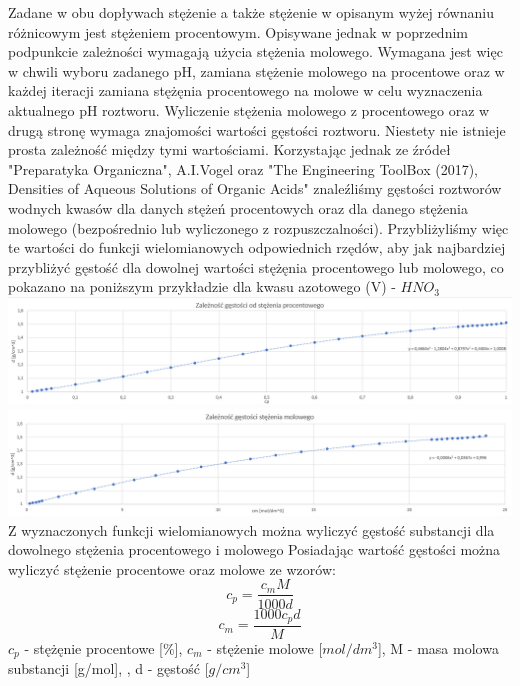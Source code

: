 \documentclass[polish,polish,a4paper,12pt]{article}
\begin{document}
\begin{enumerate}
	Zadane w obu dopływach stężenie a także stężenie w opisanym wyżej równaniu różnicowym jest stężeniem procentowym. Opisywane jednak w poprzednim podpunkcie zależności wymagają użycia stężenia molowego. Wymagana jest więc w chwili wyboru zadanego pH, zamiana stężenie molowego na procentowe oraz w każdej iteracji zamiana stężęnia procentowego na molowe w celu wyznaczenia aktualnego pH roztworu. Wyliczenie stężenia molowego z procentowego oraz w drugą stronę wymaga znajomości wartości gęstości roztworu. Niestety nie istnieje prosta zależność między tymi wartościami. Korzystając jednak ze źródeł "Preparatyka Organiczna", A.I.Vogel oraz "The Engineering ToolBox (2017), Densities of Aqueous Solutions of Organic Acids" znaleźliśmy gęstości roztworów wodnych kwasów dla danych stężeń procentowych oraz dla danego stężenia molowego (bezpośrednio lub wyliczonego z rozpuszczalności). Przybliżyliśmy więc te wartości do funkcji wielomianowych odpowiednich rzędów, aby jak najbardziej przybliżyć gęstość dla dowolnej wartości stężęnia procentowego lub molowego, co pokazano na poniższym przykładzie dla kwasu azotowego (V) - $HNO_3$\\
	
	\includegraphics[scale=0.4]{1}\\
	\includegraphics[scale=0.4]{2}\\
	
	Z wyznaczonych funkcji wielomianowych można wyliczyć gęstość substancji dla dowolnego stężenia procentowego i molowego
	Posiadając wartość gęstości można wyliczyć stężenie procentowe oraz molowe ze wzorów:
	\begin{equation*}
		c_p = \frac{c_mM}{1000d}
	\end{equation*}
	\begin{equation*}
		c_m = \frac{1000c_pd}{M}
	\end{equation*}
	{\small $c_p$ - stężęnie procentowe [\%], \hspace{1em} $c_m$ - stężenie molowe [$mol/dm^3$], \hspace{1em} M - masa molowa substancji [g/mol], \hspace{1em}, d - gęstość [$g/cm^3$]}
	\end{enumerate}
\end{document}
